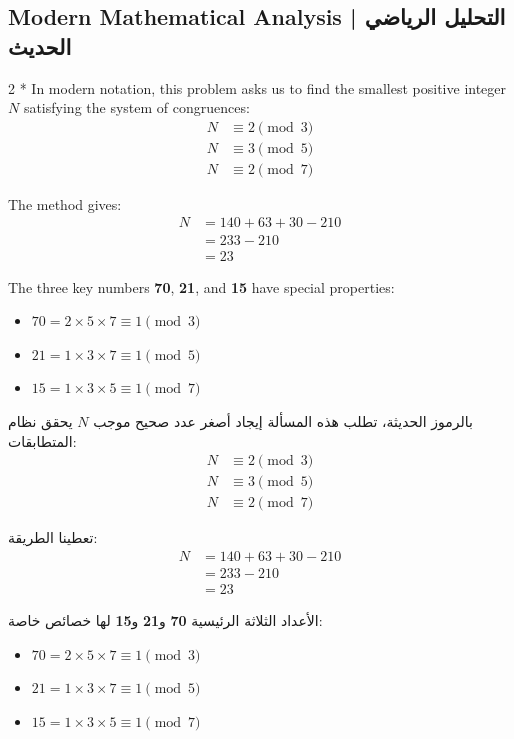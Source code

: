 \documentclass[11pt,a4paper]{article}
\newcommand{\ar}[1]{\arabicfont\beginR #1\endR}
\begin{document}
\vspace{0.5cm}

\subsection*{Modern Mathematical Analysis | \ar{التحليل الرياضي الحديث}}

\begin{paracol}{2}
\switchcolumn[0]*\noindent
In modern notation, this problem asks us to find the smallest positive integer $N$ satisfying the system of congruences:
\begin{align*}
N &\equiv 2 \pmod{3} \\
N &\equiv 3 \pmod{5} \\
N &\equiv 2 \pmod{7}
\end{align*}

The method gives:
\begin{align*}
N &= 140 + 63 + 30 - 210 \\
  &= 233 - 210 \\
  &= 23
\end{align*}

The three key numbers \textbf{70}, \textbf{21}, and \textbf{15} have special properties:
\begin{itemize}[leftmargin=1.5em,itemsep=1pt]
  \item $70 = 2 \times 5 \times 7 \equiv 1 \pmod{3}$
  \item $21 = 1 \times 3 \times 7 \equiv 1 \pmod{5}$
  \item $15 = 1 \times 3 \times 5 \equiv 1 \pmod{7}$
\end{itemize}

\switchcolumn
\noindent
\ar{بالرموز الحديثة، تطلب هذه المسألة إيجاد أصغر عدد صحيح موجب $N$ يحقق نظام المتطابقات:}
\begin{align*}
N &\equiv 2 \pmod{3} \\
N &\equiv 3 \pmod{5} \\
N &\equiv 2 \pmod{7}
\end{align*}

\ar{تعطينا الطريقة:}
\begin{align*}
N &= 140 + 63 + 30 - 210 \\
  &= 233 - 210 \\
  &= 23
\end{align*}

\ar{الأعداد الثلاثة الرئيسية \textbf{70} و\textbf{21} و\textbf{15} لها خصائص خاصة:}
\begin{itemize}[leftmargin=1.5em,itemsep=1pt]
  \item \ar{$70 = 2 \times 5 \times 7 \equiv 1 \pmod{3}$}
  \item \ar{$21 = 1 \times 3 \times 7 \equiv 1 \pmod{5}$}
  \item \ar{$15 = 1 \times 3 \times 5 \equiv 1 \pmod{7}$}
\end{itemize}
\end{paracol}
\end{document}

